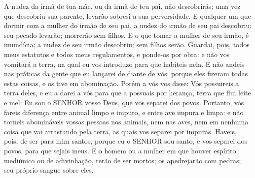 {A nudez da irmã de tua mãe, ou da irmã de teu pai, não descobrirás; uma vez que descobriu sua parente, levarão sobresi a sua perversidade.
E qualquer um que dormir com a mulher do irmão de seu pai, a nudez do irmão de seu pai descobriu; seu pecado levarão; morrerão sem filhos.
E o que tomar a mulher de seu irmão, é imundícia; a nudez de seu irmão descobriu; sem filhos serão.
Guardai, pois, todos meus estatutos e todos meus regulamentos, e ponde-os por obra: e não vos vomitará a terra, na qual eu vos introduzo para que habiteis nela.
E não andeis nas práticas da gente que eu lançarei de diante de vós: porque eles fizeram todas estas coisas, e os tive em abominação.
Porém a vós vos disse: Vós possuireis a terra deles, e eu a darei a vós para que a possuais por herança, terra que flui leite e mel: Eu sou o SENHOR vosso Deus, que vos separei dos povos.
Portanto, vós fareis diferença entre animal limpo e impuro, e entre ave impura e limpa: e não torneis abomináveis vossas pessoas nos animais, nem nas aves, nem em nenhuma coisa que vai arrastando pela terra, as quais vos separei por impuras.
Haveis, pois, de ser para mim santos, porque eu o SENHOR sou santo, e vos separei dos povos, para que sejais meus.
E o homem ou a mulher em que houver espírito mediúnico ou de adivinhação, terão de ser mortos; os apedrejarão com pedras; seu próprio sangue
{} sobre eles.

}
